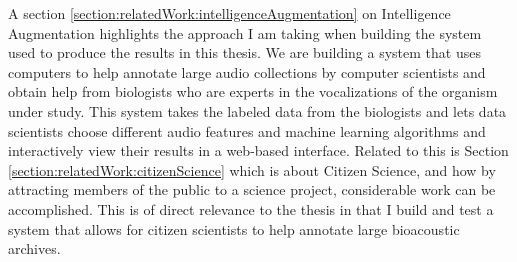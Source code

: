 A section \ref{section:relatedWork:intelligenceAugmentation} on
Intelligence Augmentation highlights the approach I am taking when
building the system used to produce the results in this thesis.  We
are building a system that uses computers to help annotate large audio
collections by computer scientists and obtain help from biologists who
are experts in the vocalizations of the organism under study.  This
system takes the labeled data from the biologists and lets data
scientists choose different audio features and machine learning
algorithms and interactively view their results in a web-based
interface.  Related to this is Section
\ref{section:relatedWork:citizenScience} which is about Citizen
Science, and how by attracting members of the public to a science
project, considerable work can be accomplished.  This is of direct
relevance to the thesis in that I build and test a system that allows
for citizen scientists to help annotate large bioacoustic archives.

